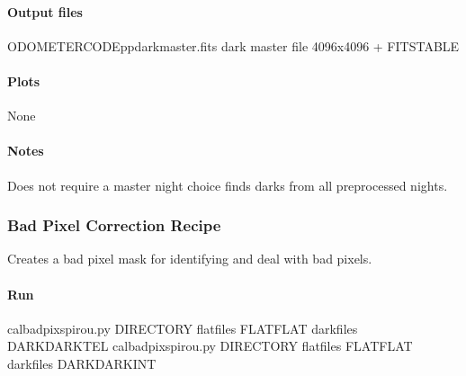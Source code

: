 \documentclass[a4paper,10pt,english]{report}
\begin{document}
\paragraph{Output files}
\label{\detokenize{user/spirou/recipes/dark_master:output-files}}
\begin{sphinxVerbatim}[commandchars=\\\{\}]
ODOMETER\PYGZus{}CODE\PYGZus{}pp\PYGZus{}dark\PYGZus{}master.fits   dark master file 4096x4096 + FITS\PYGZhy{}TABLE
\end{sphinxVerbatim}


\paragraph{Plots}
\label{\detokenize{user/spirou/recipes/dark_master:plots}}
\begin{sphinxVerbatim}[commandchars=\\\{\}]
None
\end{sphinxVerbatim}


\paragraph{Notes}
\label{\detokenize{user/spirou/recipes/dark_master:notes}}
Does not require a master night choice \sphinxhyphen{} finds darks from all preprocessed nights.


\subsubsection{Bad Pixel Correction Recipe}
\label{\detokenize{user/spirou/recipes/bad_pixel:bad-pixel-correction-recipe}}\label{\detokenize{user/spirou/recipes/bad_pixel:recipes-spirou-bad-pixels}}\label{\detokenize{user/spirou/recipes/bad_pixel::doc}}
Creates a bad pixel mask for identifying and deal with bad pixels.


\paragraph{Run}
\label{\detokenize{user/spirou/recipes/bad_pixel:run}}
\begin{sphinxVerbatim}[commandchars=\\\{\}]
cal\PYGZus{}badpix\PYGZus{}spirou.py \PYG{o}{[}DIRECTORY\PYG{o}{]} \PYGZhy{}flatfiles \PYG{o}{[}FLAT\PYGZus{}FLAT\PYG{o}{]} \PYGZhy{}darkfiles \PYG{o}{[}DARK\PYGZus{}DARK\PYGZus{}TEL\PYG{o}{]}
cal\PYGZus{}badpix\PYGZus{}spirou.py \PYG{o}{[}DIRECTORY\PYG{o}{]} \PYGZhy{}flatfiles \PYG{o}{[}FLAT\PYGZus{}FLAT\PYG{o}{]} \PYGZhy{}darkfiles \PYG{o}{[}DARK\PYGZus{}DARK\PYGZus{}INT\PYG{o}{]}
\end{sphinxVerbatim}
\end{document}
